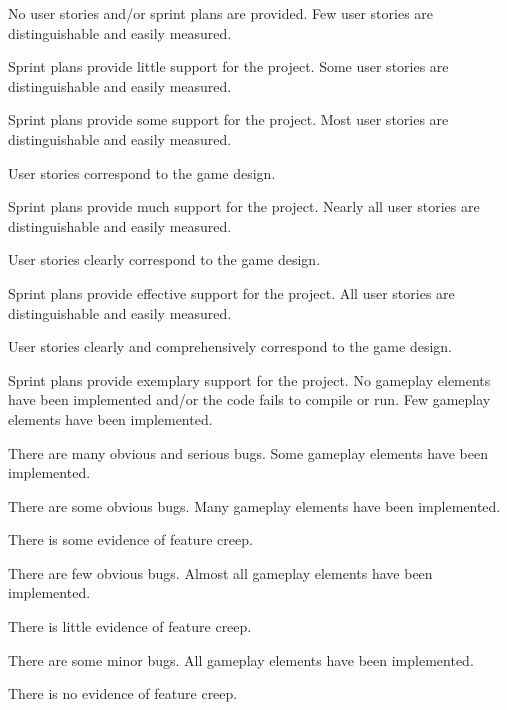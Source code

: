 \documentclass{../fal_assignment}
\begin{document}
\begin{markingrubric}
%
        \grade\fail No user stories and/or sprint plans are provided.
        \grade Few user stories are distinguishable and easily measured.
            \par Sprint plans provide little support for the project.
        \grade Some user stories are distinguishable and easily measured.
            \par Sprint plans provide some support for the project.
        \grade Most user stories are distinguishable and easily measured.
            \par User stories correspond to the game design.
            \par Sprint plans provide much support for the project.
        \grade Nearly all user stories are distinguishable and easily measured.
            \par User stories clearly correspond to the game design.
            \par Sprint plans provide effective support for the project.
        \grade All user stories are distinguishable and easily measured.
            \par User stories clearly and comprehensively correspond to the game design.
            \par Sprint plans provide exemplary support for the project.
%
        \grade\fail No gameplay elements have been implemented and/or the code fails to compile or run.
        \grade Few gameplay elements have been implemented.
            \par There are many obvious and serious bugs.
        \grade Some gameplay elements have been implemented.
            \par There are some obvious bugs.
        \grade Many gameplay elements have been implemented.
            \par There is some evidence of feature creep.
            \par There are few obvious bugs.
        \grade Almost all gameplay elements have been implemented.
            \par There is little evidence of feature creep.
            \par There are some minor bugs.
        \grade All gameplay elements have been implemented.
            \par There is no evidence of feature creep.

\end{markingrubric}
\end{document}
